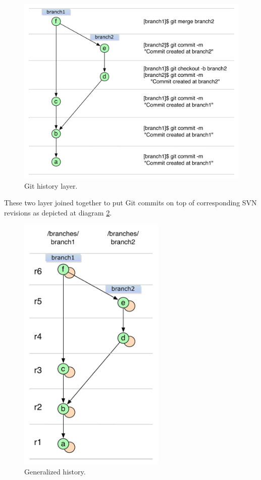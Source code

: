 \begin{enumerate}
	\begin{figure}[!h]
	\label{git_layer}
	\centering
	\includegraphics[width=\linewidth]{img/legend/git_layer.pdf}
	\caption{Git history layer.}
	\end{figure}
	
\end{enumerate}

\newpage
These two layer joined together to put Git commits on top of corresponding SVN revisions as depicted at diagram \ref{both_layers}.

\begin{figure}[!h]
\label{both_layers}
\centering
\includegraphics[width=7.0cm]{img/legend/generalized_history.pdf}
\caption{Generalized history.}
\end{figure}